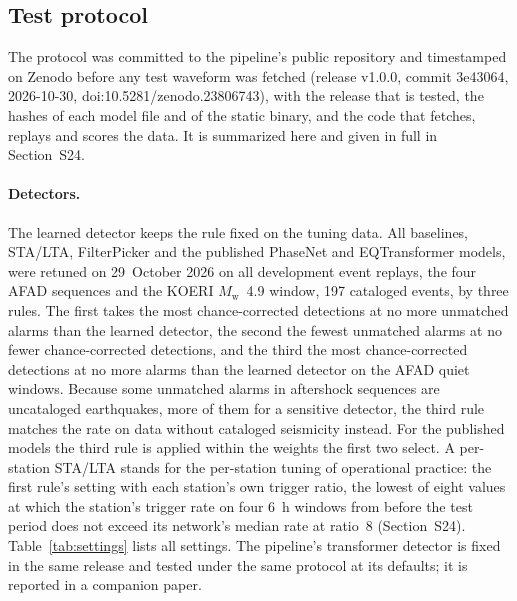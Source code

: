 \documentclass[a4paper,fleqn]{cas-sc}
\newcommand{\Mw}{$M_\mathrm{w}$}
\newcommand{\stalta}{STA/LTA}
\begin{document}
\subsection{Test protocol}\label{sec:protocol}

The protocol was committed to the pipeline's public repository and timestamped on
Zenodo before any test waveform was fetched (release v1.0.0, commit 3e43064,
2026-10-30, doi:10.5281/zenodo.23806743), with the release that is tested, the
hashes of each model file and of the static binary, and the code that fetches,
replays and scores the data. It is summarized here and given in full in Section~S24.

\paragraph{Detectors.} The learned detector keeps the rule fixed on the tuning data.
All baselines, \stalta{}, FilterPicker and the published PhaseNet and EQTransformer
models, were retuned on 29~October 2026 on all development event replays, the four
AFAD sequences and the KOERI \Mw{}~4.9 window, 197 cataloged events, by three
rules. The first takes the most chance-corrected detections at no more
unmatched alarms than the learned detector, the second the fewest unmatched alarms at
no fewer chance-corrected detections, and the third the most chance-corrected
detections at no more alarms than the learned detector on the AFAD quiet windows.
Because some unmatched alarms in aftershock sequences are uncataloged earthquakes,
more of them for a sensitive detector, the third rule matches the rate on data without
cataloged seismicity instead. For the published models the third rule is applied
within the weights the first two select. A per-station \stalta{} stands for the
per-station tuning of operational practice: the first rule's setting with each
station's own trigger ratio, the lowest of eight values at which the station's trigger
rate on four 6~h windows from before the test period does not exceed its network's
median rate at ratio~8 (Section~S24). Table~\ref{tab:settings} lists all settings.
The pipeline's transformer detector is fixed in the same release and tested under the
same protocol at its defaults; it is reported in a companion paper.
\end{document}
